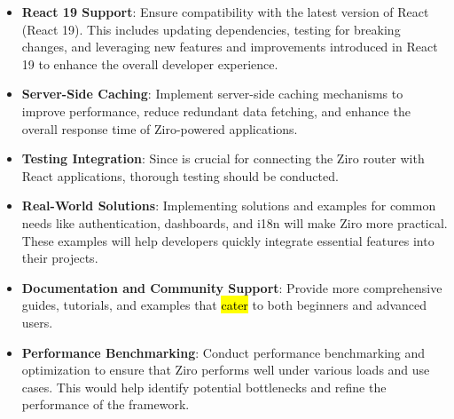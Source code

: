 \begin{itemize}
	\item \textbf{React 19 Support}: Ensure compatibility with the latest version of React (React 19). This includes updating dependencies, testing for breaking changes, and leveraging new features and improvements introduced in React 19 to enhance the overall developer experience.

	\item  \textbf{Server-Side Caching}: Implement server-side caching mechanisms to improve performance, reduce redundant data fetching, and enhance the overall response time of Ziro-powered applications.

	\item \textbf{Testing  Integration}: Since  is crucial for connecting the Ziro router with React applications, thorough testing should be conducted.


	\item  \textbf{Real-World Solutions}: Implementing solutions and examples for common needs like authentication, dashboards, and i18n will make Ziro more practical. These examples will help developers quickly integrate essential features into their projects.

	\item  \textbf{Documentation and Community Support}: Provide more comprehensive guides, tutorials, and examples that \hl{cater} to both beginners and advanced users.

	\item  \textbf{Performance Benchmarking}: Conduct performance benchmarking and optimization to ensure that Ziro performs well under various loads and use cases. This would help identify potential bottlenecks and refine the performance of the framework.

\end{itemize}

\pagebreak
